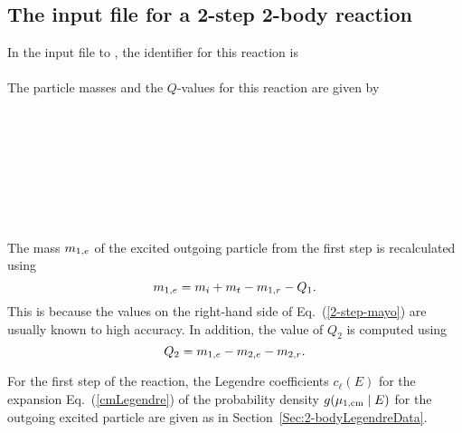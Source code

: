 {\subsection{The input file for a 2-step 2-body reaction}
In the input file to \gettransfer, the identifier for this reaction is\\
  \\
The particle masses and the $Q$-values for this reaction are
given by\\
 \\ 
 \\
 \\
 \\
 \\
 \\
 \\ 
 \\
The mass $m_{1,e}$ of the excited outgoing particle
from the first step is recalculated using
\begin{equation}
   m_{1,e} = m_i + m_t - m_{1,r} - Q_1.
 \label{2-step-mayo}
\end{equation}
This is because the values on the right-hand side
of Eq.~(\ref{2-step-mayo}) are usually known to high accuracy.
In addition, the value of $Q_2$ is computed using
$$
  Q_2 = m_{1,e} - m_{2,e} - m_{2,r}.
$$

For the first step of the reaction, the Legendre
coefficients $c_\ell(E)$ for the expansion 
Eq.~(\ref{cmLegendre}) of the probability
density $g( \mu_{\text{1,cm}} \mid E)$ 
for the outgoing excited particle are given as
in Section~\ref{Sec:2-bodyLegendreData}.

}
